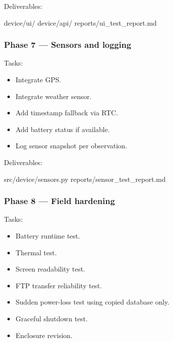 \documentclass[
  11pt,
]{article}
\newenvironment{Shaded}{}{}
\newcommand{\NormalTok}[1]{#1}
\providecommand{\tightlist}{%
  \setlength{\itemsep}{0pt}\setlength{\parskip}{0pt}}
\begin{document}
Deliverables:

\begin{Shaded}
\begin{Highlighting}[]
\NormalTok{device/ui/}
\NormalTok{device/api/}
\NormalTok{reports/ui\_test\_report.md}
\end{Highlighting}
\end{Shaded}

\subsubsection{Phase 7 --- Sensors and
logging}\label{phase-7-sensors-and-logging}

Tasks:

\begin{itemize}
\tightlist
\item[$\square$]
  Integrate GPS.
\item[$\square$]
  Integrate weather sensor.
\item[$\square$]
  Add timestamp fallback via RTC.
\item[$\square$]
  Add battery status if available.
\item[$\square$]
  Log sensor snapshot per observation.
\end{itemize}

Deliverables:

\begin{Shaded}
\begin{Highlighting}[]
\NormalTok{src/device/sensors.py}
\NormalTok{reports/sensor\_test\_report.md}
\end{Highlighting}
\end{Shaded}

\subsubsection{Phase 8 --- Field
hardening}\label{phase-8-field-hardening}

Tasks:

\begin{itemize}
\tightlist
\item[$\square$]
  Battery runtime test.
\item[$\square$]
  Thermal test.
\item[$\square$]
  Screen readability test.
\item[$\square$]
  FTP transfer reliability test.
\item[$\square$]
  Sudden power-loss test using copied database only.
\item[$\square$]
  Graceful shutdown test.
\item[$\square$]
  Enclosure revision.
\end{itemize}
\end{document}
